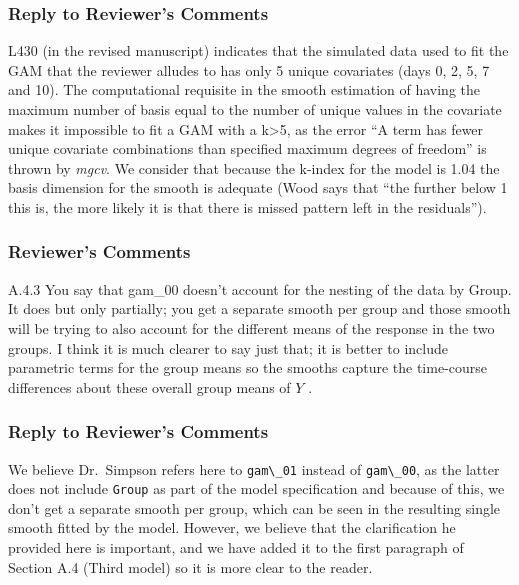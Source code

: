 \documentclass[
]{article}
\newcommand{\passthrough}[1]{#1}
\begin{document}
\hypertarget{section-10}{%
\subsubsection{\texorpdfstring{\textcolor{reviewersblue} {Reply to Reviewer's Comments}}{}}\label{section-10}}

L430 (in the revised manuscript) indicates that the simulated data used to fit the GAM that the reviewer alludes to has only 5 unique covariates (days 0, 2, 5, 7 and 10). The computational requisite in the smooth estimation of having the maximum number of basis equal to the number of unique values in the covariate makes it impossible to fit a GAM with a k\textgreater5, as the error ``A term has fewer unique covariate combinations than specified maximum degrees of freedom'' is thrown by \emph{mgcv}. We consider that because the k-index for the model is 1.04 the basis dimension for the smooth is adequate (Wood says that ``the further below 1 this is, the more likely it is that there is missed pattern left in the residuals'').

\hypertarget{reviewers-comments-10}{%
\subsubsection{Reviewer's Comments}\label{reviewers-comments-10}}

A.4.3 You say that gam\_00 doesn't account for the nesting of the data by Group. It does but only partially; you get a separate smooth per group and those smooth will be trying to also account for the different means of the response in the two groups. I think it is much clearer to say just that; it is better to include
parametric terms for the group means so the smooths capture the time-course differences about these overall group means of \(Y\) .

\hypertarget{section-11}{%
\subsubsection{\texorpdfstring{\textcolor{reviewersblue} {Reply to Reviewer's Comments}}{}}\label{section-11}}

We believe Dr.~Simpson refers here to \passthrough{\lstinline!gam\_01!} instead of \passthrough{\lstinline!gam\_00!}, as the latter does not include \passthrough{\lstinline!Group!} as part of the model specification and because of this, we don't get a separate smooth per group, which can be seen in the resulting single smooth fitted by the model. However, we believe that the clarification he provided here is important, and we have added it to the first paragraph of Section A.4 (Third model) so it is more clear to the reader.
\end{document}
